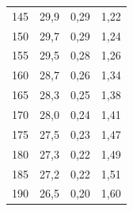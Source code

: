 \documentclass{article}
\begin{document}
\begin{tabular}{cccc}
	145            & 29,9                         & 0,29                                                                 & 1,22     \\
	150            & 29,7                         & 0,29                                                                 & 1,24     \\
	155            & 29,5                         & 0,28                                                                 & 1,26     \\
	160            & 28,7                         & 0,26                                                                 & 1,34     \\
	165            & 28,3                         & 0,25                                                                 & 1,38     \\
	170            & 28,0                         & 0,24                                                                 & 1,41     \\
	175            & 27,5                         & 0,23                                                                 & 1,47     \\
	180            & 27,3                         & 0,22                                                                 & 1,49     \\
	185            & 27,2                         & 0,22                                                                 & 1,51     \\
	190            & 26,5                         & 0,20                                                                 & 1,60 
\end{tabular}
\end{document}
